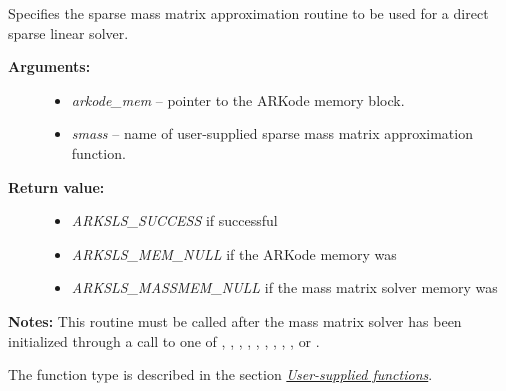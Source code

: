\documentclass[letterpaper,10pt,english]{sphinxmanual}
\begin{document}
\begin{fulllineitems}
\label{c_interface/User_callable:ARKSlsSetSparseMassFn}
Specifies the sparse mass matrix approximation routine to
be used for a direct sparse linear solver.
\begin{description}
\item[{\textbf{Arguments:}}] \leavevmode\begin{itemize}
\item {} 
\emph{arkode\_mem} -- pointer to the ARKode memory block.

\item {} 
\emph{smass} -- name of user-supplied sparse mass matrix approximation function.

\end{itemize}

\item[{\textbf{Return value:}}] \leavevmode\begin{itemize}
\item {} 
\emph{ARKSLS\_SUCCESS}  if successful

\item {} 
\emph{ARKSLS\_MEM\_NULL}  if the ARKode memory was 

\item {} 
\emph{ARKSLS\_MASSMEM\_NULL} if the mass matrix solver memory was 

\end{itemize}

\end{description}

\textbf{Notes:} This routine must be called after the mass matrix solver
has been initialized through a call to one of
{\hyperref[c_interface/User_callable:ARKMassDense]{}}, {\hyperref[c_interface/User_callable:ARKMassLapackDense]{}},
{\hyperref[c_interface/User_callable:ARKMassBand]{}}, {\hyperref[c_interface/User_callable:ARKMassLapackBand]{}},
{\hyperref[c_interface/User_callable:ARKMassKLU]{}}, {\hyperref[c_interface/User_callable:ARKMassSuperLUMT]{}},
{\hyperref[c_interface/User_callable:ARKMassSpgmr]{}}, {\hyperref[c_interface/User_callable:ARKMassSpbcg]{}},
{\hyperref[c_interface/User_callable:ARKMassSptfqmr]{}}, {\hyperref[c_interface/User_callable:ARKMassSpfgmr]{}} or
{\hyperref[c_interface/User_callable:ARKMassPcg]{}}.

The function type {\hyperref[c_interface/User_supplied:ARKSlsSparseMassFn]{}} is described in the section
{\hyperref[c_interface/User_supplied:cinterface-usersupplied]{\emph{User-supplied functions}}}.

\end{fulllineitems}
\end{document}
